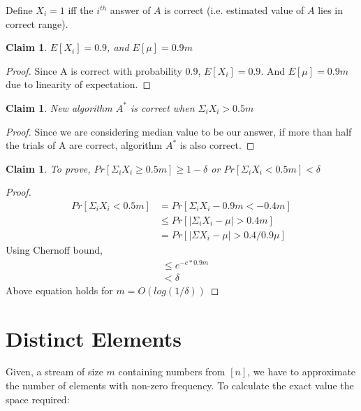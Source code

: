 \documentclass[11pt]{article}
\newtheorem{claim}[theorem]{Claim}
\begin{document}
Define $X_{i} = 1$ iff the $i^{th}$ answer of $A$ is correct (i.e. estimated value of $A$ lies in correct range).

\begin{claim}
$E[X_{i}] = 0.9$, and $E[\mu] = 0.9m$
\end{claim}

\begin{proof}
Since A is correct with probability 0.9, $E[X_{i}] = 0.9$. And $E[\mu] = 0.9m$ due to linearity of expectation.
\end{proof}

\begin{claim}
New algorithm $A^{\ast}$ is correct when $\Sigma_{i} X_{i} > 0.5m$
\end{claim}

\begin{proof}
Since we are considering median value to be our answer, if more than half the trials of A are correct, algorithm $A^{\ast}$ is also correct.
\end{proof}

\begin{claim}
To prove, $Pr[\Sigma_{i} X_{i} \ge 0.5m] \ge 1-\delta$ or $Pr[\Sigma_{i} X_{i} < 0.5m] < \delta$
\end{claim}

\begin{proof}
\begin{equation}
\begin{split}
Pr[\Sigma_{i} X_{i} < 0.5m] & = Pr[\Sigma_{i} X_{i} - 0.9m < -0.4m]\\
& \le Pr[|\Sigma_{i} X_{i} - \mu| > 0.4m]\\
& = Pr[|\Sigma X_{i} - \mu| > 0.4/0.9 \mu]
\end{split}
\end{equation}
Using Chernoff bound,
\begin{equation}
\begin{split}
& \leq e^{-c*0.9m}\\
& < \delta
\end{split}
\end{equation}
Above equation holds for $m = O(log(1/\delta))$
\end{proof}

\section{Distinct Elements}
Given, a stream of size $m$ containing numbers from $[n]$, we have to approximate the number of elements with non-zero frequency. To calculate the exact value the space required:
\end{document}

